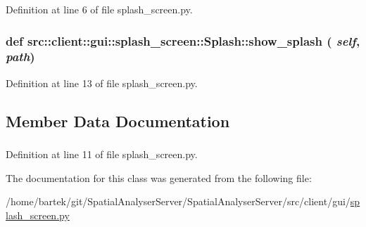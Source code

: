 Definition at line 6 of file splash\_\-screen.py.

\hypertarget{classsrc_1_1client_1_1gui_1_1splash__screen_1_1Splash_a1ecaba75b7d19bf95c44f9fb2dd71cf1}{
\subsubsection[{show\_\-splash}]{\setlength{\rightskip}{0pt plus 5cm}def src::client::gui::splash\_\-screen::Splash::show\_\-splash ( {\em self}, \/   {\em path})}}
\label{classsrc_1_1client_1_1gui_1_1splash__screen_1_1Splash_a1ecaba75b7d19bf95c44f9fb2dd71cf1}


Definition at line 13 of file splash\_\-screen.py.



\subsection{Member Data Documentation}
\hypertarget{classsrc_1_1client_1_1gui_1_1splash__screen_1_1Splash_aed0559e54d58963a7e91980faec90891}{
\subsubsection[{confSplashImageLoc}]{}}
\label{classsrc_1_1client_1_1gui_1_1splash__screen_1_1Splash_aed0559e54d58963a7e91980faec90891}


Definition at line 11 of file splash\_\-screen.py.



The documentation for this class was generated from the following file:\begin{DoxyCompactItemize}
\item 
/home/bartek/git/SpatialAnalyserServer/SpatialAnalyserServer/src/client/gui/\hyperlink{splash__screen_8py}{splash\_\-screen.py}\end{DoxyCompactItemize}
